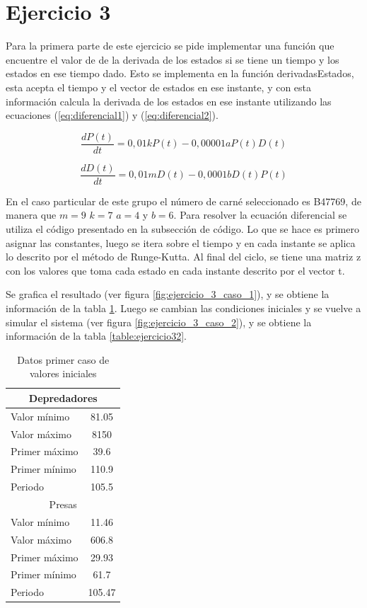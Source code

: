 \documentclass[12pt,letterpaper]{article}
\begin{document}
\section{Ejercicio 3}

Para la primera parte de este ejercicio se pide implementar una función  que encuentre el valor de de la derivada de los estados si se tiene un tiempo y los estados en ese tiempo dado. Esto se implementa en la función derivadasEstados, esta acepta el tiempo y el vector de estados en ese instante, y con esta información calcula la derivada de los estados en ese instante utilizando las ecuaciones (\ref{eq:diferencial1}) y (\ref{eq:diferencial2}). 

\begin{equation}
\frac{dP(t)}{dt}=0,01kP(t)-0,00001aP(t)D(t)
\label{eq:diferencial1}
\end{equation}

\begin{equation}
\frac{dD(t)}{dt}=0,01mD(t)-0,0001bD(t)P(t)
\label{eq:diferencial2}
\end{equation}

En el caso particular de este grupo el número de carné seleccionado es B47769, de manera que $m=9$ $k=7$ $a=4$ y $b=6$. Para resolver la ecuación diferencial se utiliza el código presentado en la subsección de código. Lo que se hace es primero asignar las constantes, luego se itera sobre el tiempo y en cada instante se aplica lo descrito por el método de Runge-Kutta. Al final del ciclo, se tiene una matriz z con los valores que toma cada estado en cada instante descrito por el vector t. 

Se grafica el resultado (ver figura \ref{fig:ejercicio_3_caso_1}), y se obtiene la información de la tabla \ref{table:ejercicio31}. Luego se cambian las condiciones iniciales y se vuelve a simular el sistema (ver figura \ref{fig:ejercicio_3_caso_2}), y se obtiene la información de la tabla \ref{table:ejercicio32}.


\begin{table}
\caption{Datos primer caso de valores iniciales}
\label{table:ejercicio31}
\centering
\begin{tabular}{| l | c |}
  \hline
 \multicolumn{2}{|c|}{Depredadores} \\
 \hline
 Valor mínimo &81.05 \\
 Valor máximo &8150\\
 Primer máximo&39.6\\
 Primer mínimo&110.9\\
 Periodo      &105.5\\
 \hline
 \multicolumn{2}{|c|}{Presas} \\
 \hline
 Valor mínimo &11.46\\
 Valor máximo &606.8\\
 Primer máximo&29.93\\
 Primer mínimo&61.7\\
 Periodo      &105.47\\
 \hline
\end{tabular}
\end{table}
\end{document}
